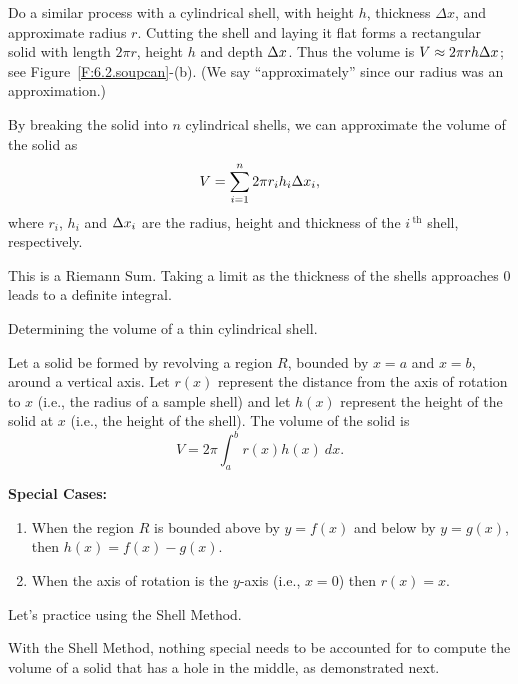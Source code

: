 Do a similar process with a cylindrical shell, with height $h$, thickness $\Delta x$, and approximate radius $r$. Cutting the shell and laying it flat forms a rectangular solid with length $2\pi r$, height $h$ and depth $\Delta x$. Thus the volume is $V \approx 2\pi rh\Delta x$; see Figure~\ref{F:6.2.soupcan}-(b). (We say ``approximately'' since our radius was an approximation.)

By breaking the solid into $n$ cylindrical shells, we can approximate the volume of the solid as
$$V = \sum_{i=1}^n 2\pi r_ih_i\Delta x_i,$$ where $r_i$, $h_i$ and $\Delta x_i$ are the radius, height and thickness of the $i\,^\text{th}$ shell, respectively. 

This is a Riemann Sum. Taking a limit as the thickness of the shells approaches $0$ leads to a definite integral.

\begin{marginfigure}[1cm] %

\caption{Determining the volume of a thin cylindrical shell.}\label{F:6.2.soupcan}
\end{marginfigure}

{Let a solid be formed by revolving a region $R$, bounded by $x=a$ and $x=b$, around a vertical axis. Let $r(x)$ represent the distance from the axis of rotation to $x$ (i.e., the radius of a sample shell) and let $h(x)$ represent the height of the solid at $x$ (i.e., the height of the shell). The volume of the solid is 
$$V = 2\pi\int_a^b r(x)h(x)\ dx.$$
} %

\textbf{Special Cases:}
\begin{enumerate}[1)]
\item When the region $R$ is bounded above by $y=f(x)$ and below by $y=g(x)$, then $h(x) = f(x)-g(x)$.
\item	When the axis of rotation is the $y$-axis (i.e., $x=0$) then $r(x) = x$.
\end{enumerate}
	
Let's practice using the Shell Method.


With the Shell Method, nothing special needs to be accounted for to compute the volume of a solid that has a hole in the middle, as demonstrated next.


